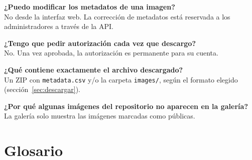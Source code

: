 \documentclass[11pt,a4paper]{article}
\newcommand{\seccion}[1]{\clearpage\section{#1}}
\begin{document}
\textbf{¿Puedo modificar los metadatos de una imagen?}\\
No desde la interfaz web. La corrección de metadatos está reservada a los
administradores a través de la API.

\textbf{¿Tengo que pedir autorización cada vez que descargo?}\\
No. Una vez aprobada, la autorización es permanente para su cuenta.

\textbf{¿Qué contiene exactamente el archivo descargado?}\\
Un ZIP con \texttt{metadata.csv} y/o la carpeta \texttt{images/}, según el formato
elegido (sección~\ref{sec:descargar}).

\textbf{¿Por qué algunas imágenes del repositorio no aparecen en la galería?}\\
La galería solo muestra las imágenes marcadas como públicas.

\seccion{Glosario}
\label{sec:glosario}
\end{document}

